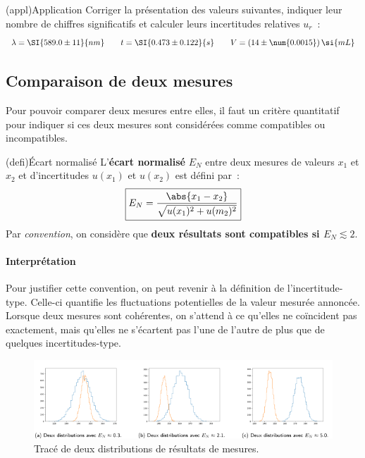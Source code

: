 \documentclass[../main/main.tex]{subfiles}
\begin{document}
\begin{tcb}(appl){Application}
	Corriger la présentation des valeurs suivantes, indiquer leur nombre de
	chiffres significatifs et calculer leurs incertitudes relatives $u_r$~:
	\[
		\lambda = \SI{589.0\pm11}{nm}
		\qquad
		t = \SI{0.473 \pm 0.122}{s}
		\qquad
		V = (14 \pm \num{0.0015})\,\si{mL}
	\]
	\tcblower
\end{tcb}

\subsection{Comparaison de deux mesures}
Pour pouvoir comparer deux mesures entre elles, il faut un critère quantitatif
pour indiquer si ces deux mesures sont considérées comme compatibles ou
incompatibles.
\begin{tcb}(defi){Écart normalisé}
	L'\textbf{écart normalisé} $E_N$ entre deux mesures de valeurs $x_1$ et $x_2$ et d'incertitudes
	$u(x_1)$ et $u(x_2)$ est défini par~:
	\[
		\boxed{E_N = \frac{\abs{x_1-x_2}}{\sqrt{u(x_1)^{2} + u(m_2)^{2}}}}
	\]
	Par \textit{convention}, on considère que \textbf{deux résultats sont
		compatibles si $E_N \lesssim 2$}.
\end{tcb}

\paragraph*{Interprétation}
Pour justifier cette convention, on peut revenir à la définition de
l'incertitude-type. Celle-ci quantifie les fluctuations potentielles de la
valeur mesurée annoncée. Lorsque deux mesures sont cohérentes, on s'attend à ce
qu'elles ne coïncident pas exactement, mais qu'elles ne s'écartent pas l'une de
l'autre de plus que de quelques incertitudes-type.

\begin{figure}[htbp]
	\centering
	\includegraphics[scale=1]{zscore}
	\caption{Tracé de deux distributions de résultats de mesures.}
	\label{fig:zscore}
\end{figure}
\end{document}
